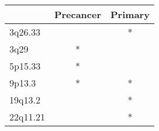 \begin{tabular}{lcc}
\toprule
{} & Precancer & Primary \\
\midrule
3q26.33  &           &       * \\
3q29     &         * &         \\
5p15.33  &         * &         \\
9p13.3   &         * &       * \\
19q13.2  &           &       * \\
22q11.21 &           &       * \\
\bottomrule
\end{tabular}
